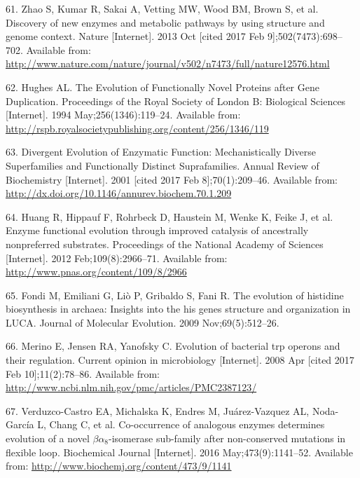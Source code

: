 \documentclass[12pt,twoside]{reedthesis}
\begin{document}
  \hypertarget{ref-zhao_discovery_2013}{}
  61. Zhao S, Kumar R, Sakai A, Vetting MW, Wood BM, Brown S, et al.
  Discovery of new enzymes and metabolic pathways by using structure and
  genome context. Nature {[}Internet{]}. 2013 Oct {[}cited 2017 Feb
  9{]};502(7473):698--702. Available from:
  \url{http://www.nature.com/nature/journal/v502/n7473/full/nature12576.html}
  
  \hypertarget{ref-hughes_evolution_1994}{}
  62. Hughes AL. The Evolution of Functionally Novel Proteins after Gene
  Duplication. Proceedings of the Royal Society of London B: Biological
  Sciences {[}Internet{]}. 1994 May;256(1346):119--24. Available from:
  \url{http://rspb.royalsocietypublishing.org/content/256/1346/119}
  
  \hypertarget{ref-gerlt_divergent_2001}{}
  63. Divergent Evolution of Enzymatic Function: Mechanistically Diverse
  Superfamilies and Functionally Distinct Suprafamilies. Annual Review of
  Biochemistry {[}Internet{]}. 2001 {[}cited 2017 Feb 8{]};70(1):209--46.
  Available from: \url{http://dx.doi.org/10.1146/annurev.biochem.70.1.209}
  
  \hypertarget{ref-huang_enzyme_2012}{}
  64. Huang R, Hippauf F, Rohrbeck D, Haustein M, Wenke K, Feike J, et al.
  Enzyme functional evolution through improved catalysis of ancestrally
  nonpreferred substrates. Proceedings of the National Academy of Sciences
  {[}Internet{]}. 2012 Feb;109(8):2966--71. Available from:
  \url{http://www.pnas.org/content/109/8/2966}
  
  \hypertarget{ref-fondi_evolution_2009}{}
  65. Fondi M, Emiliani G, Liò P, Gribaldo S, Fani R. The evolution of
  histidine biosynthesis in archaea: Insights into the his genes structure
  and organization in LUCA. Journal of Molecular Evolution. 2009
  Nov;69(5):512--26.
  
  \hypertarget{ref-merino_evolution_2008}{}
  66. Merino E, Jensen RA, Yanofsky C. Evolution of bacterial trp operons
  and their regulation. Current opinion in microbiology {[}Internet{]}.
  2008 Apr {[}cited 2017 Feb 10{]};11(2):78--86. Available from:
  \url{http://www.ncbi.nlm.nih.gov/pmc/articles/PMC2387123/}
  
  \hypertarget{ref-verduzco-castro_co-occurrence_2016}{}
  67. Verduzco-Castro EA, Michalska K, Endres M, Juárez-Vazquez AL,
  Noda-García L, Chang C, et al. Co-occurrence of analogous enzymes
  determines evolution of a novel \(\beta\alpha_8\)-isomerase sub-family
  after non-conserved mutations in flexible loop. Biochemical Journal
  {[}Internet{]}. 2016 May;473(9):1141--52. Available from:
  \url{http://www.biochemj.org/content/473/9/1141}
  
\end{document}

